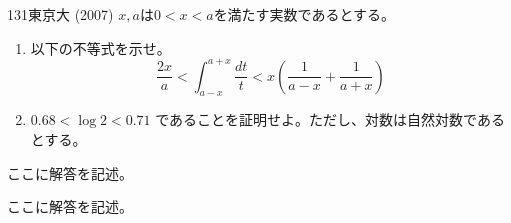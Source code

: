 \begin{thm}{131}{}{東京大 (2007)}
 $x, a$は$0<x<a$を満たす実数であるとする。
 \begin{enumerate}
  \item 以下の不等式を示せ。
	\[ \frac{2x}{a} < \int_{a-x}^{a+x}\! \frac{dt}{t} < x\left(\frac{1}{a-x}+\frac{1}{a+x}\right) \]
  \item $0.68 < \log 2 < 0.71$ であることを証明せよ。ただし、対数は自然対数であるとする。
 \end{enumerate}
\end{thm}

ここに解答を記述。

ここに解答を記述。